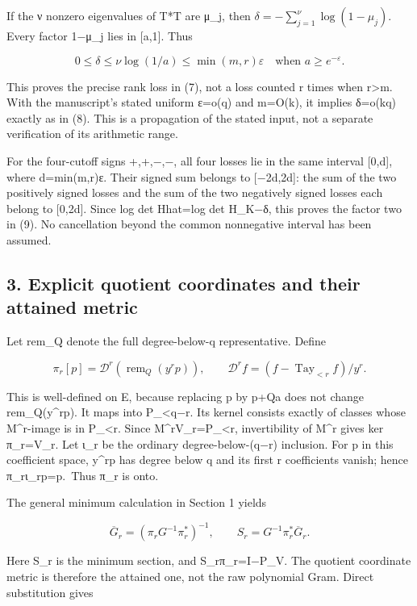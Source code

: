 If the ν nonzero eigenvalues of T*T are μ\_j, then \(\delta=-\sum_{j=1}^{\nu}\log(1-\mu_j)\). Every factor 1−μ\_j lies in {[}a,1{]}. Thus

\[
0\le\delta\le\nu\log(1/a)\le\min(m,r)\varepsilon
\quad\text{when }a\ge e^{-\varepsilon}. \tag{F7}
\]

This proves the precise rank loss in (7), not a loss counted r times when r\textgreater m. With the manuscript's stated uniform ε=o(q) and m=O(k), it implies δ=o(kq) exactly as in (8). This is a propagation of the stated input, not a separate verification of its arithmetic range.

For the four-cutoff signs +,+,−,−, all four losses lie in the same interval {[}0,d{]}, where d=min(m,r)ε. Their signed sum belongs to {[}−2d,2d{]}: the sum of the two positively signed losses and the sum of the two negatively signed losses each belong to {[}0,2d{]}. Since log det Hhat=log det H\_K−δ, this proves the factor two in (9). No cancellation beyond the common nonnegative interval has been assumed.

\subsection{3. Explicit quotient coordinates and their attained metric}\label{explicit-quotient-coordinates-and-their-attained-metric}

Let rem\_Q denote the full degree-below-q representative. Define

\[
\pi_r[p]=\mathscr D^r(\operatorname{rem}_Q(y^rp)),\qquad
\mathscr D^rf=(f-\operatorname{Tay}_{<r}f)/y^r.
\tag{F10}
\]

This is well-defined on E, because replacing p by p+Qa does not change rem\_Q(y\^{}rp). It maps into P\_\textless q−r. Its kernel consists exactly of classes whose M\^{}r-image is in P\_\textless r. Since M\^{}rV\_r=P\_\textless r, invertibility of M\^{}r gives ker π\_r=V\_r. Let ι\_r be the ordinary degree-below-(q−r) inclusion. For p in this coefficient space, y\^{}rp has degree below q and its first r coefficients vanish; hence π\_rι\_rp=p.~Thus π\_r is onto.

The general minimum calculation in Section 1 yields

\[
\overline G_r=(\pi_rG^{-1}\pi_r^*)^{-1},\qquad
S_r=G^{-1}\pi_r^*\overline G_r. \tag{F11}
\]

Here S\_r is the minimum section, and S\_rπ\_r=I−P\_V. The quotient coordinate metric is therefore the attained one, not the raw polynomial Gram. Direct substitution gives

